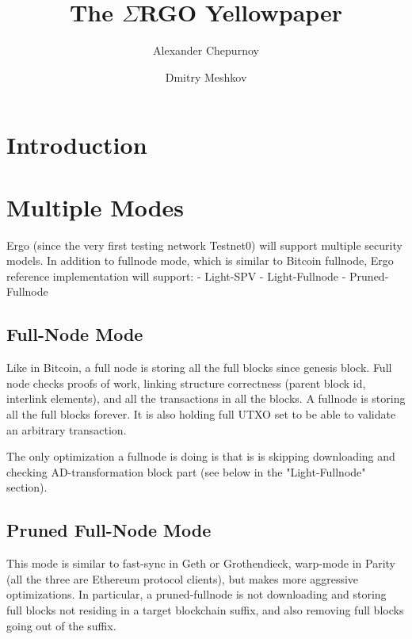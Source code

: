\documentclass[]{report}   %
\newcommand{\ergo}{$\Sigma$RGO}
\begin{document}
\title{The \ergo{} Yellowpaper}
\author{Alexander Chepurnoy \and Dmitry Meshkov}
\maketitle

\section{Introduction}

\section{Multiple Modes}

Ergo (since the very first testing network Testnet0) will support 
multiple security models. In addition to fullnode mode, which is
similar to Bitcoin fullnode, Ergo reference implementation will 
support:
   - Light-SPV
   - Light-Fullnode
   - Pruned-Fullnode
  

\subsection{Full-Node Mode}  

  
Like in Bitcoin, a full node is storing all the full blocks since 
genesis block. Full node checks proofs of work, linking structure 
correctness (parent block id, interlink elements), and all the 
transactions in all the blocks. A fullnode is storing all the full 
blocks forever. It is also holding full UTXO set to be able to validate an 
arbitrary transaction. 

The only optimization a fullnode is doing is that is is skipping downloading and checking 
AD-transformation block part (see below in the "Light-Fullnode" section).

   
\subsection{Pruned Full-Node Mode}

   
This mode is similar to fast-sync in Geth or Grothendieck, warp-mode 
in Parity (all the three are Ethereum protocol clients), but makes
 more aggressive optimizations. In particular, a pruned-fullnode is 
 not downloading and storing full blocks not residing in a target 
 blockchain suffix, and also removing full blocks going out of the suffix.
 
\end{document}
